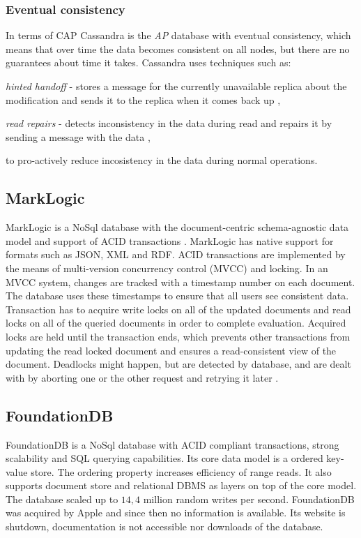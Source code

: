\subsubsection{Eventual consistency}\label{sec:theory:eventualConsistency}
In terms of CAP \cite{brewer2000towards} \cite{Brewer:2012ba} Cassandra is the \emph{AP} database with eventual consistency, which means that over time the data becomes consistent on all nodes, but there are no guarantees about time it takes. Cassandra uses techniques such as: \begin{enumerate*} 
\item \emph{hinted handoff} - stores a message for the currently unavailable replica about the modification and sends it to the replica when it comes back up \cite{CassandraHintedHandoff},  
\item \emph{read repairs} - detects inconsistency in the data during read and repairs it by sending a message with the data \cite{CassandraReadRepair},  \end{enumerate*} to pro-actively reduce incosistency in the data during normal operations.

\subsection{MarkLogic}
MarkLogic is a NoSql database with the document-centric schema-agnostic data model \cite{markLogicDataModel} and support of ACID transactions \cite{markLogicAcid}.
MarkLogic has native support for formats such as JSON, XML and RDF. ACID transactions are implemented by the means of multi-version concurrency control (MVCC) and locking. In an MVCC system, changes are tracked with a timestamp number on each document. 
The database uses these timestamps to ensure that all users see consistent data. 
Transaction has to acquire write locks on all of the updated documents and read locks on all of the queried documents in order to complete evaluation. Acquired locks are held until the transaction ends, which prevents other transactions from updating the read locked document and ensures a read-consistent view of the document. 
Deadlocks might happen, but are detected by database, and are dealt with by aborting one or the other request and retrying it later \cite{markLogicUnderstandingTransactions}.


\subsection{FoundationDB}
FoundationDB is a NoSql database with ACID compliant transactions, strong scalability and SQL querying capabilities.
Its core data model is a ordered key-value store. The ordering property increases efficiency of range reads. It also supports document store and relational DBMS as layers on top of the core model.  The database scaled up to $14,4$ million random writes per second. FoundationDB was acquired by Apple \cite{foundationDbAcquired} and since then no information is available. Its website is shutdown, documentation is not accessible nor downloads of the database.


